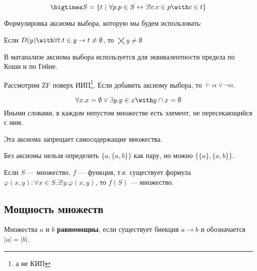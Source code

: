 \begin{definition}
    \[\bigtimes S = \{t\ |\ \forall p.p \in S \leftrightarrow \exists! c.c \in p \with c \in t\}\]
\end{definition}

Формулировка аксиомы выбора, которую мы будем использовать:

\begin{axiom*}[выбора]
    Если \(D(y) \with \forall t.t \in y \to t \neq \emptyset\), то \(\bigtimes y \neq \emptyset\)
\end{axiom*}

\begin{remark}
    В матанализе аксиома выбора используется для эквивалентности предела по Коши и по Гейне.
\end{remark}

\begin{theorem}[Диаконеску]
    Рассмотрим ZF поверх ИИП\footnote{а не КИП}. Если добавить аксиому выбора, то \(\vdash \alpha \lor \neg \alpha\).
\end{theorem}

\begin{axiom}[фундирования]
    \label{фундирования}
    \[\forall x.x = \emptyset \lor \exists y.y \in x \with y \cap x = \emptyset\]
    Иными словами, в каждом непустом множестве есть элемент, не пересекающийся с ним.
\end{axiom}

\begin{remark}
    Эта аксиома запрещает самосодержащие множества.
\end{remark}

\begin{remark}
    Без аксиомы  нельзя определить \(\{a, \{a, b\}\}\) как пару, но можно \(\{\{a\}, \{a, b\}\}\).
\end{remark}

\begin{axiom}
    Если \(S\) --- множество, \(f\) --- функция, т.е. существует формула \(\varphi(x, y) : \forall x \in S.\exists!y.\varphi(x, y)\), то \(f(S)\) --- множество.
\end{axiom}

\subsection{Мощность множеств}

\begin{definition}
    Множества \(a\) и \(b\) \textbf{равномощны}, если существует биекция \(a \to b\) и обозначается \(|a| = |b|\).
\end{definition}

